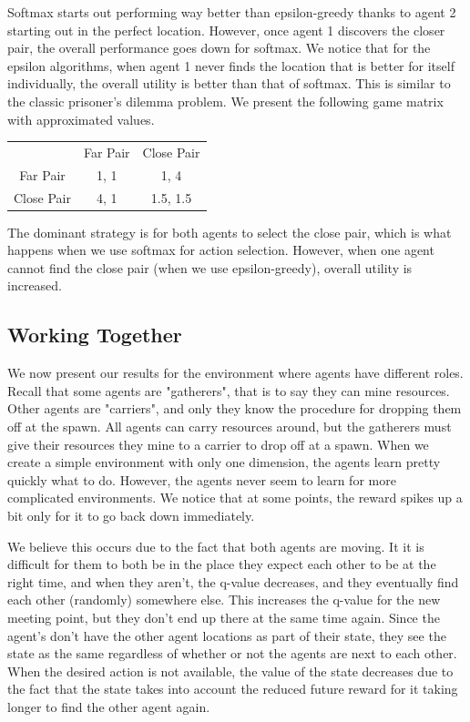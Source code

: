 \documentclass[11pt]{article}
\begin{document}
Softmax starts out performing way better than epsilon-greedy thanks to agent 2 starting out in the perfect location. However, once agent 1 discovers the closer pair, the overall performance goes down for softmax. We notice that for the epsilon algorithms, when agent 1 never finds the location that is better for itself individually, the overall utility is better than that of softmax. This is similar to the classic prisoner's dilemma problem. We present the following game matrix with approximated values.
\begin{center}
\begin{tabular}{ c c c }
  & Far Pair & Close Pair \\ 
 Far Pair & 1, 1 & 1, 4 \\  
 Close Pair & 4, 1 & 1.5, 1.5    
\end{tabular}
\end{center}

The dominant strategy is for both agents to select the close pair, which is what happens when we use softmax for action selection. However, when one agent cannot find the close pair (when we use epsilon-greedy), overall utility is increased.

\subsection{Working Together}

We now present our results for the environment where agents have different roles. Recall that some agents are "gatherers", that is to say they can mine resources. Other agents are "carriers", and only they know the procedure for dropping them off at the spawn. All agents can carry resources around, but the gatherers must give their resources they mine to a carrier to drop off at a spawn. When we create a simple environment with only one dimension, the agents learn pretty quickly what to do. However, the agents never seem to learn for more complicated environments. We notice that at some points, the reward spikes up a bit only for it to go back down immediately.

We believe this occurs due to the fact that both agents are moving. It it is difficult for them to both be in the place they expect each other to be at the right time, and when they aren't, the q-value decreases, and they eventually find each other (randomly) somewhere else. This increases the q-value for the new meeting point, but they don't end up there at the same time again. Since the agent's don't have the other agent locations as part of their state, they see the state as the same regardless of whether or not the agents are next to each other. When the desired action is not available, the value of the state decreases due to the fact that the state takes into account the reduced future reward for it taking longer to find the other agent again.\\
\end{document}
